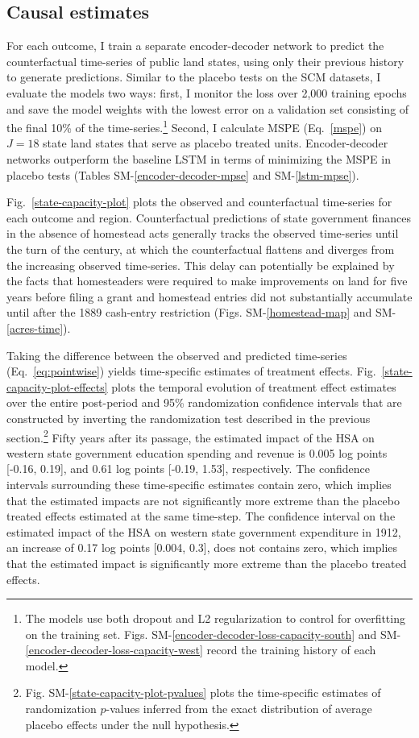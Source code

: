 \documentclass[12pt]{article}
\begin{document}
\subsection{Causal estimates}

For each outcome, I train a separate encoder-decoder network to predict the counterfactual time-series of public land states, using only their previous history to generate predictions. Similar to the placebo tests on the SCM datasets, I evaluate the models two ways: first, I monitor the loss over 2,000 training epochs and save the model weights with the lowest error on a validation set consisting of the final 10\% of the time-series.\footnote{The models use both dropout and L2 regularization to control for overfitting on the training set. Figs. SM-\ref{encoder-decoder-loss-capacity-south} and SM-\ref{encoder-decoder-loss-capacity-west} record the training history of each model.} Second, I calculate MSPE (Eq.~\ref{mspe}) on $J=18$ state land states that serve as placebo treated units. Encoder-decoder networks outperform the baseline LSTM in terms of minimizing the MSPE in placebo tests (Tables SM-\ref{encoder-decoder-mpse} and SM-\ref{lstm-mpse}).

Fig.~\ref{state-capacity-plot} plots the observed and counterfactual time-series for each outcome and region. Counterfactual predictions of state government finances in the absence of homestead acts generally tracks the observed time-series until the turn of the century, at which the counterfactual flattens and diverges from the increasing observed time-series. This delay can potentially be explained by the facts that homesteaders were required to make improvements on land for five years before filing a grant and homestead entries did not substantially accumulate until after the 1889 cash-entry restriction (Figs. SM-\ref{homestead-map} and SM-\ref{acres-time}). 

Taking the difference between the observed and predicted time-series (Eq.~\ref{eq:pointwise}) yields time-specific estimates of treatment effects. Fig.~\ref{state-capacity-plot-effects} plots the temporal evolution of treatment effect estimates over the entire post-period and 95\% randomization confidence intervals that are constructed by inverting the randomization test described in the previous section.\footnote{Fig. SM-\ref{state-capacity-plot-pvalues} plots the time-specific estimates of randomization $p$-values inferred from the exact distribution of average placebo effects under the null hypothesis.} Fifty years after its passage, the estimated impact of the HSA on western state government education spending and revenue is 0.005 log points [-0.16, 0.19], and 0.61 log points [-0.19, 1.53], respectively. The confidence intervals surrounding these time-specific estimates contain zero, which implies that the estimated impacts are not significantly more extreme than the placebo treated effects estimated at the same time-step. The confidence interval on the estimated impact of the HSA on western state government expenditure in 1912, an increase of 0.17 log points [0.004, 0.3], does not contains zero, which implies that the estimated impact is significantly more extreme than the placebo treated effects. 
\end{document}
